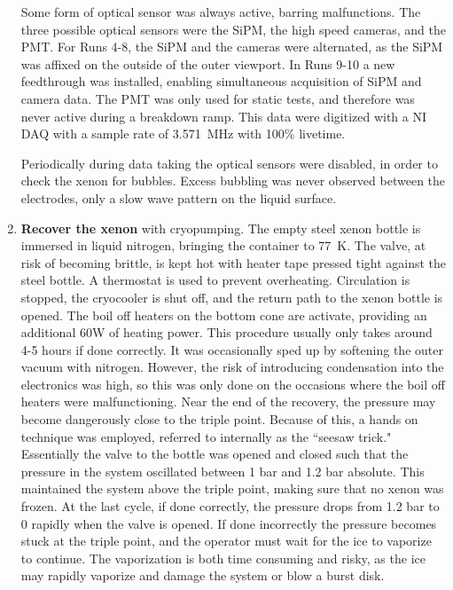 \begin{enumerate}
    Some form of optical sensor was always active, barring malfunctions.
    The three possible optical sensors were the SiPM, the high speed cameras, and the PMT.
    For Runs 4-8, the SiPM and the cameras were alternated, as the SiPM was affixed on the outside of the outer viewport. 
    In Runs 9-10 a new feedthrough was installed, enabling simultaneous  acquisition of SiPM and camera data.
    The PMT was only used for static tests, and therefore was never active during a breakdown ramp.
    This data were digitized with a NI DAQ with a sample rate of 3.571~MHz with 100\% livetime.
    
    Periodically during data taking the optical sensors were disabled, in order to check the xenon for bubbles. 
    Excess bubbling was never observed between the electrodes, only a slow wave pattern on the liquid surface.
    \item \textbf{Recover the xenon} with cryopumping.
    The  empty steel xenon bottle is immersed in liquid nitrogen, bringing the container to 77~K. 
    The valve, at risk of becoming brittle, is kept hot with heater tape pressed tight against the steel bottle.
    A thermostat is used to prevent overheating.
    Circulation is stopped, the cryocooler is shut off, and the return path to the xenon bottle is opened. 
    The boil off heaters on the bottom cone are activate, providing an additional 60W of heating power.
    This procedure usually only takes around 4-5 hours if done correctly.
    It was occasionally sped up by softening the outer vacuum with nitrogen.
    However, the risk of introducing condensation into the electronics was high, so this was only done on the occasions where the boil off heaters were malfunctioning.
    Near the end of the recovery, the pressure may become dangerously close to the triple point.
    Because of this, a hands on technique was employed, referred to internally as the ``seesaw trick."
    Essentially the valve to the bottle was opened and closed such that the pressure in the system oscillated between 1 bar and 1.2 bar absolute. 
    This maintained the system above the triple point, making sure that no xenon was frozen.
    At the last cycle, if done correctly, the pressure drops from 1.2 bar to 0 rapidly when the valve is opened.
    If done incorrectly the pressure becomes stuck at the triple point, and the operator must wait for the ice to vaporize to continue.
    The vaporization is both time consuming and risky, as the ice may rapidly vaporize and damage the system or blow a burst disk.
\end{enumerate}
